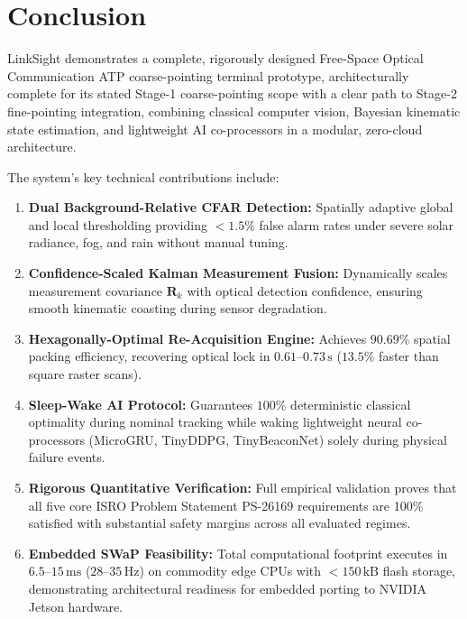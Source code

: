 \documentclass[11pt,a4paper]{article}
\begin{document}
\section{Conclusion}

LinkSight demonstrates a complete, rigorously designed Free-Space Optical Communication ATP coarse-pointing terminal prototype, architecturally complete for its stated Stage-1 coarse-pointing scope with a clear path to Stage-2 fine-pointing integration, combining classical computer vision, Bayesian kinematic state estimation, and lightweight AI co-processors in a modular, zero-cloud architecture.

The system's key technical contributions include:
\begin{enumerate}[noitemsep,topsep=2pt,leftmargin=1.2em]
    \item \textbf{Dual Background-Relative CFAR Detection:} Spatially adaptive global and local thresholding providing $< 1.5\%$ false alarm rates under severe solar radiance, fog, and rain without manual tuning.
    \item \textbf{Confidence-Scaled Kalman Measurement Fusion:} Dynamically scales measurement covariance $\mathbf{R}_k$ with optical detection confidence, ensuring smooth kinematic coasting during sensor degradation.
    \item \textbf{Hexagonally-Optimal Re-Acquisition Engine:} Achieves $90.69\%$ spatial packing efficiency, recovering optical lock in $0.61$--$0.73\,\text{s}$ ($13.5\%$ faster than square raster scans).
    \item \textbf{Sleep-Wake AI Protocol:} Guarantees $100\%$ deterministic classical optimality during nominal tracking while waking lightweight neural co-processors (MicroGRU, TinyDDPG, TinyBeaconNet) solely during physical failure events.
    \item \textbf{Rigorous Quantitative Verification:} Full empirical validation proves that all five core ISRO Problem Statement PS-26169 requirements are 100\% satisfied with substantial safety margins across all evaluated regimes.
    \item \textbf{Embedded SWaP Feasibility:} Total computational footprint executes in $6.5$--$15\,\text{ms}$ ($28$--$35\,\text{Hz}$) on commodity edge CPUs with $< 150\,\text{kB}$ flash storage, demonstrating architectural readiness for embedded porting to NVIDIA Jetson hardware.
\end{enumerate}
\end{document}
